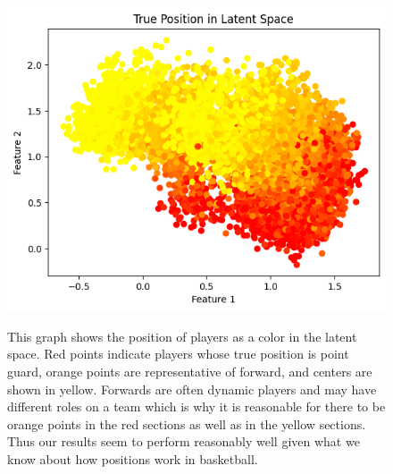 \documentclass[12pt, letterpaper, titlepage]{article}
\begin{document}
\begin{figure}
  \centering
  \begin{minipage}[b]{0.35\textwidth}
    \includegraphics[width=\linewidth]{linearcombo}
    \label{fig:linearcombo}
  \end{minipage}
  \hfill
  \begin{minipage}[b]{0.5\textwidth}
    This graph shows the position of players as a color in the latent space. Red points indicate players whose true position is point guard, orange points are representative of forward, and centers are shown in yellow.  Forwards are often dynamic players and may have different roles on a team which is why it is reasonable for there to be orange points in the red sections as well as in the yellow sections.  Thus our results seem to perform reasonably well given what we know about how positions work in basketball.
  \end{minipage}

  \vspace{1em} %



\end{figure}
\end{document}
